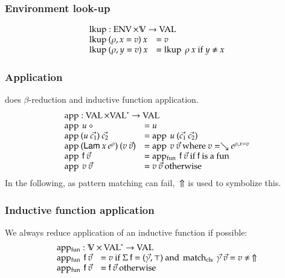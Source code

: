 \subsubsection{Environment look-up}
\[
\begin{array}{ll}
\multicolumn{2}{l}{\lkup : \Env \times \cV \ra \Val }\\
\lkup \: (\ins{\rho}{x}{v}) \: x & = v \\
\lkup \: (\ins{\rho}{y}{v}) \: x & = \lkup \: \rho \: x \mbox{ if } y \neq x  
\end{array}
\]

\subsubsection{Application}
does $\beta$-reduction and inductive function application. 
\[
\begin{array}{ll}
\multicolumn{2}{l}{\ap : \Val \times \ves{\Val} \ra \Val}\\
\ap \: u \: \diamond & = u \\
\ap \: (u \: \vec{c_1}) \: \vec{c_2} & = \ap \: u \: (\vec{c_1}\:\vec{c_2})\\
\ap \: (\vlam \: x \: \cl{e}{\rho}) \: (v \: \vec{v}) & = \ap \: v \: \vec{v} \mbox{ where } v = \wh \cl{e}{\ins{\rho}{x}{v}} \\ 
\ap \: \ff \: \vec{v} & = \apf \: \ff \: \vec{v} \mbox{ if } \ff \mbox{ is a } \fun \\ 
\ap \: v \: \vec{v} & = v \: \vec{v} \mbox{ otherwise } \\
\end{array}
\]
In the following, as pattern matching can fail, $\:\Uparrow$ is used to symbolize this. 
\subsubsection{Inductive function application}
We always reduce application of an inductive function if possible:\[
\begin{array}{ll}
\multicolumn{2}{l}{\apf : \cV \times \ves{\Val} \ra \Val}\\
\apf \: \ff \: \vec{v} & = v \mbox{ if } \Sig \: \ff = (\vec{\gamma},\top) \mbox { and } \matchcls \: \vec{\gamma} \: \vec{v} = v \neq \stuck \\ 
\apf \: \ff \: \vec{v} & = \ff \: \vec{v} \mbox { otherwise } 
\end{array}
\]


